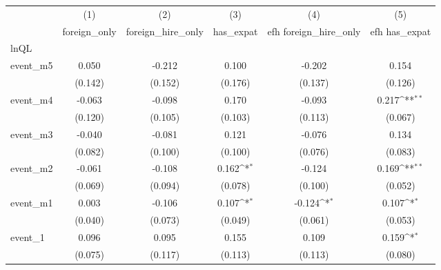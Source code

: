 {
\def\sym#1{\ifmmode^{#1}\else\(^{#1}\)\fi}
\begin{tabular}{l*{5}{c}}
\hline\hline
            &\multicolumn{1}{c}{(1)}&\multicolumn{1}{c}{(2)}&\multicolumn{1}{c}{(3)}&\multicolumn{1}{c}{(4)}&\multicolumn{1}{c}{(5)}\\
            &\multicolumn{1}{c}{foreign\_only}&\multicolumn{1}{c}{foreign\_hire\_only}&\multicolumn{1}{c}{has\_expat}&\multicolumn{1}{c}{efh foreign\_hire\_only}&\multicolumn{1}{c}{efh has\_expat}\\
\hline
lnQL        &                     &                     &                     &                     &                     \\
event\_m5    &       0.050         &      -0.212         &       0.100         &      -0.202         &       0.154         \\
            &     (0.142)         &     (0.152)         &     (0.176)         &     (0.137)         &     (0.126)         \\
[1em]
event\_m4    &      -0.063         &      -0.098         &       0.170         &      -0.093         &       0.217\sym{**} \\
            &     (0.120)         &     (0.105)         &     (0.103)         &     (0.113)         &     (0.067)         \\
[1em]
event\_m3    &      -0.040         &      -0.081         &       0.121         &      -0.076         &       0.134         \\
            &     (0.082)         &     (0.100)         &     (0.100)         &     (0.076)         &     (0.083)         \\
[1em]
event\_m2    &      -0.061         &      -0.108         &       0.162\sym{*}  &      -0.124         &       0.169\sym{**} \\
            &     (0.069)         &     (0.094)         &     (0.078)         &     (0.100)         &     (0.052)         \\
[1em]
event\_m1    &       0.003         &      -0.106         &       0.107\sym{*}  &      -0.124\sym{*}  &       0.107\sym{*}  \\
            &     (0.040)         &     (0.073)         &     (0.049)         &     (0.061)         &     (0.053)         \\
[1em]
event\_1     &       0.096         &       0.095         &       0.155         &       0.109         &       0.159\sym{*}  \\
            &     (0.075)         &     (0.117)         &     (0.113)         &     (0.113)         &     (0.080)         \\

\end{tabular}}
